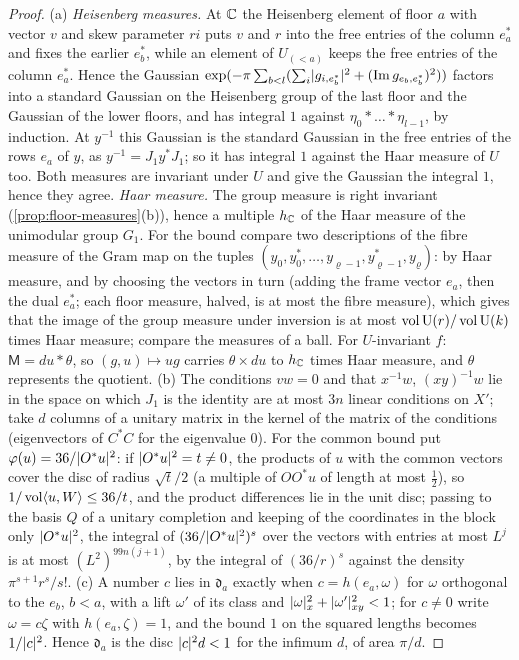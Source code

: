 \begin{proof}
(a) \emph{Heisenberg measures.} At $\mathbb{C}$ the Heisenberg element of floor $a$ with vector $v$ and skew parameter $ri$ puts $v$ and $r$ into the free entries of the column $e^*_a$ and fixes the earlier $e^*_b$, while an element of $U_{(<a)}$ keeps the free
entries of the column $e^*_a$. Hence the Gaussian $\exp(-\pi\sum_{b<l}(\sum_i\lvert g_{i,e^*_b}\rvert^2+(\operatorname{Im} g_{e_b,e^*_b})^2))$ factors into a standard Gaussian on the Heisenberg group of the last floor and the Gaussian of the lower floors, and has
integral $1$ against $\eta_0*\dots*\eta_{l-1}$, by induction. At $y^{-1}$ this Gaussian is the standard Gaussian in the free entries of the rows $e_a$ of $y$, as $y^{-1}=J_1y^*J_1$; so it has integral $1$ against the Haar measure of $U$ too.
Both measures are invariant under $U$ and give the Gaussian the integral $1$, hence they agree. \emph{Haar measure.} The group measure is right invariant (\cref{prop:floor-measures}(b)), hence a multiple $h_{\mathbb{C}}$ of the Haar measure of
the unimodular group $G_1$. For the bound compare two descriptions of the fibre measure of the Gram map on the tuples $(y_0,y^*_0,\dots,y_{\varrho-1},y^*_{\varrho-1},y_\varrho)$: by Haar measure, and by choosing the vectors in turn (adding the frame
vector $e_a$, then the dual $e^*_a$; each floor measure, halved, is at most the fibre measure), which gives that the image of the group measure under inversion is at most $\operatorname{vol}\operatorname{U}(r)/\operatorname{vol}\operatorname{U}(k)$ times Haar measure; compare the measures of a
ball. For $U$-invariant $f$: $\mathsf M=du*\theta$, so $(g,u)\mapsto ug$ carries $\theta\times du$ to $h_{\mathbb{C}}$ times Haar measure, and $\theta$ represents the quotient. (b) The conditions $vw=0$ and that $x^{-1}w$, $(xy)^{-1}w$ lie in the space on which $J_1$ is the
identity are at most $3n$ linear conditions on $X'$; take $d$ columns of a unitary matrix in the kernel of the matrix of the conditions (eigenvectors of $C^*C$ for the eigenvalue $0$). For the common bound put $\varphi(u)=36/\lvert O^*u\rvert^2$: if
$\lvert O^*u\rvert^2=t\ne0$, the products of $u$ with the common vectors cover the disc of radius $\sqrt t/2$ (a multiple of $OO^*u$ of length at most $\frac12$), so $1/\operatorname{vol}\langle u,W\rangle\le36/t$, and the product differences lie in the unit disc; passing to
the basis $Q$ of a unitary completion and keeping of the coordinates in the block only $\lvert O^*u\rvert^2$, the integral of $(36/\lvert O^*u\rvert^2)^s$ over the vectors with entries at most $L^j$ is at most $(L^2)^{99n(j+1)}$, by the integral of
$(36/r)^s$ against the density $\pi^{s+1}r^s/s!$. (c) A number $c$ lies in $\mathfrak d_a$ exactly when $c=h(e_a,\omega)$ for $\omega$ orthogonal to the $e_b$, $b<a$, with a lift $\omega'$ of its class and $\lvert \omega\rvert_x^2+\lvert \omega'\rvert_{xy}^2<1$; for
$c\ne0$ write $\omega=c\zeta$ with $h(e_a,\zeta)=1$, and the bound $1$ on the squared lengths becomes $1/\lvert c\rvert^2$. Hence $\mathfrak d_a$ is the disc $\lvert c\rvert^2d<1$ for the infimum $d$, of area $\pi/d$.
\end{proof}

